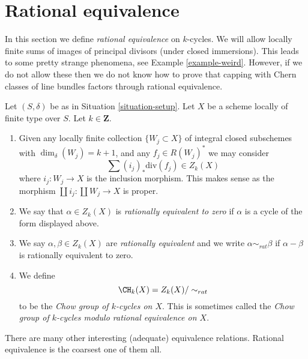 \section{Rational equivalence}
\label{section-rational-equivalence}

\noindent
In this section we define {\it rational equivalence} on $k$-cycles.
We will allow locally finite sums of images of
principal divisors (under closed immersions). This leads to some
pretty strange phenomena, see Example \ref{example-weird}.
However, if we do not allow these then we do not know how to prove that
capping with Chern classes of line bundles factors through rational
equivalence.

\begin{definition}
\label{definition-rational-equivalence}
Let $(S, \delta)$ be as in Situation \ref{situation-setup}.
Let $X$ be a scheme locally of finite type over $S$.
Let $k \in \mathbf{Z}$.
\begin{enumerate}
\item Given any locally finite collection $\{W_j \subset X\}$
of integral closed subschemes with $\dim_\delta(W_j) = k + 1$,
and any $f_j \in R(W_j)^*$ we may consider
$$
\sum (i_j)_*\text{div}(f_j) \in Z_k(X)
$$
where $i_j : W_j \to X$ is the inclusion morphism.
This makes sense as the morphism
$\coprod i_j : \coprod W_j \to X$ is proper.
\item We say that $\alpha \in Z_k(X)$ is {\it rationally equivalent to zero}
if $\alpha$ is a cycle of the form displayed above.
\item We say $\alpha, \beta \in Z_k(X)$ are
{\it rationally equivalent} and we write $\alpha \sim_{rat} \beta$
if $\alpha - \beta$ is rationally equivalent to zero.
\item We define
$$
\CH_k(X) = Z_k(X) / \sim_{rat}
$$
to be the {\it Chow group of $k$-cycles on $X$}. This is sometimes called
the {\it Chow group of $k$-cycles modulo rational equivalence on $X$}.
\end{enumerate}
\end{definition}

\noindent
There are many other interesting (adequate) equivalence relations.
Rational equivalence is the coarsest one of them all.

